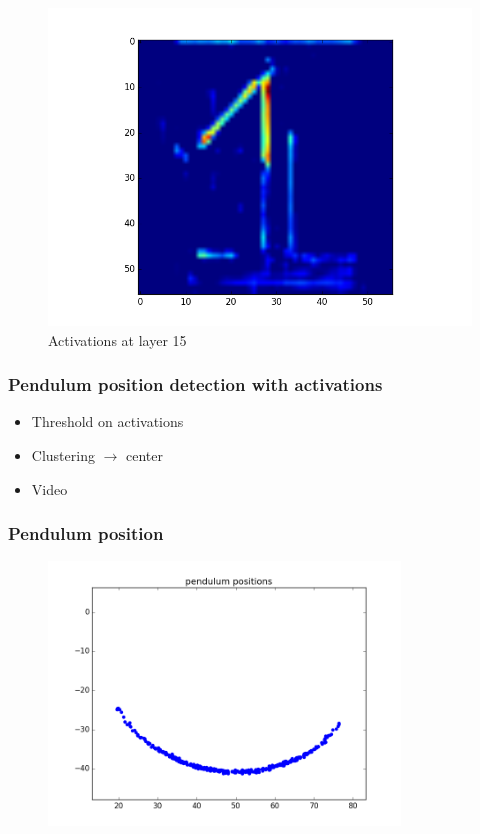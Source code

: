 \documentclass{beamer}
\begin{document}
\begin{frame}
\begin{figure}
\endminipage\hfill
{}%
  \includegraphics[width=\linewidth]{activation3.png}
\endminipage\hfill
  \caption{Activations at layer 15}
\end{figure}

\end{frame}

\begin{frame}
\frametitle{Pendulum position detection with activations}
\begin{itemize}
	\item Threshold on activations
	\item Clustering $\rightarrow$ center
	\item Video
\end{itemize}
\end{frame}


\begin{frame}
  \frametitle{Pendulum position}
  \begin{figure}
    \includegraphics[height=7cm]{pendulum_positions.png}
  \end{figure}
\end{frame}
\end{document}

